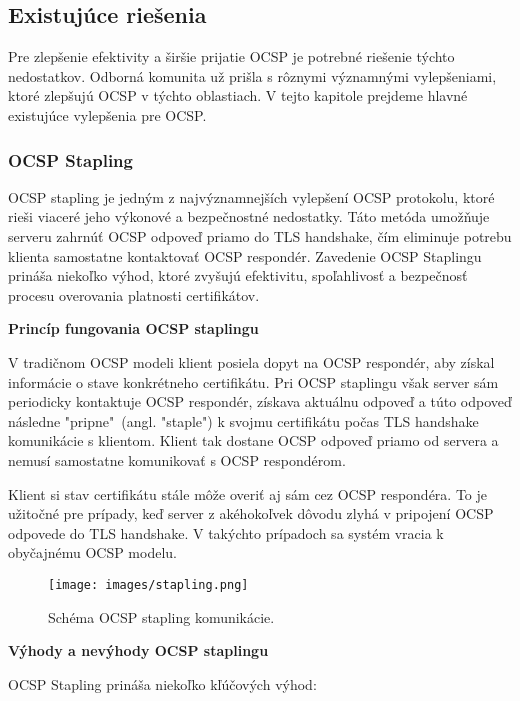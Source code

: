 \documentclass[12pt, twoside]{book}
\newcommand{\subsubsubsection}[1]{%
  \vspace{0.2em}  
  \textbf{#1} \\[0.2em]
  \hspace*{\parindent}
}
\begin{document}
\subsection{Existujúce riešenia}
Pre zlepšenie efektivity a širšie prijatie OCSP je potrebné riešenie týchto nedostatkov. Odborná komunita už prišla s rôznymi významnými vylepšeniami, ktoré zlepšujú OCSP v týchto oblastiach. V tejto kapitole prejdeme hlavné existujúce vylepšenia pre OCSP.


\subsubsection{OCSP Stapling}
OCSP stapling je jedným z najvýznamnejších vylepšení OCSP protokolu, ktoré rieši viaceré jeho výkonové a bezpečnostné nedostatky. Táto metóda umožňuje serveru zahrnúť OCSP odpoveď priamo do TLS handshake, čím eliminuje potrebu klienta samostatne kontaktovať OCSP respondér. Zavedenie OCSP Staplingu prináša niekoľko výhod, ktoré zvyšujú efektivitu, spoľahlivosť a bezpečnosť procesu overovania platnosti certifikátov.

\subsubsubsection{Princíp fungovania OCSP staplingu}
V tradičnom OCSP modeli klient posiela dopyt na OCSP respondér, aby získal informácie o stave konkrétneho certifikátu. Pri OCSP staplingu však server sám periodicky kontaktuje OCSP respondér, získava aktuálnu odpoveď a túto odpoveď následne "pripne"\ (angl. "staple") k svojmu certifikátu počas TLS handshake komunikácie s klientom. Klient tak dostane OCSP odpoveď priamo od servera a nemusí samostatne komunikovať s OCSP respondérom. 

Klient si stav certifikátu stále môže overiť aj sám cez OCSP respondéra. To je užitočné pre prípady, keď server z akéhokoľvek dôvodu zlyhá v pripojení OCSP odpovede do TLS handshake. V takýchto prípadoch sa systém vracia k obyčajnému OCSP modelu.

\begin{figure}[H]
\centering
\texttt{[image: images/stapling.png]}
\caption{Schéma OCSP stapling komunikácie.}
\end{figure}

\subsubsubsection{Výhody a  nevýhody OCSP staplingu}
OCSP Stapling prináša niekoľko kľúčových výhod:
\end{document}

